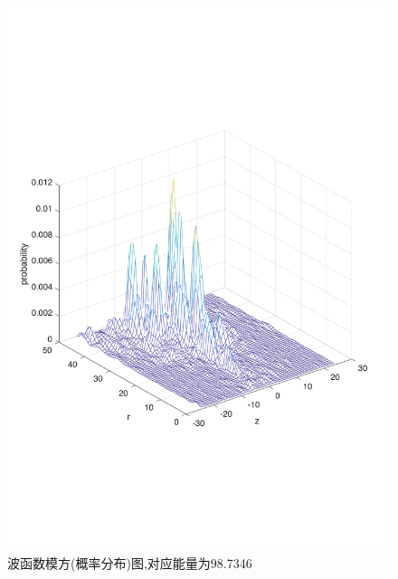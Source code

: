   \begin{figure}[htp]
    \centering
    \includegraphics[scale =0.60]{pic/7.pdf}
    \caption{波函数模方(概率分布)图,对应能量为98.7346}
\end{figure}

 
 
 
 
 
 
 